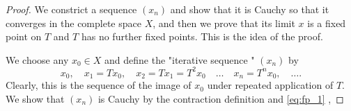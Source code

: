 \documentclass{article}
\theoremstyle{remark}
\begin{document}
\begin{proof}
  We constrict a sequence $\left( x_{n} \right)$ and show that it is Cauchy so that it converges in the complete space $X$, and then we prove that its limit $x$ is a fixed point on $T$ and $T$ has no further fixed points. This is the idea of the proof. 
  \par
  We choose any $x_0 \in X$ and define the "iterative sequence " $\left( x_{n} \right)$ by 
  \begin{equation}
  \label{eq:fp_1}
    x_0, \quad  x_1 = Tx_0, \quad  x_2 =Tx_1 = T^{2}x_0 \quad \ldots \quad x_{n} = T^{n} x_0, \quad   \ldots    
  .\end{equation}
  Clearly, this is the sequence of the image of $x_0$ under repeated application of $T$. We show that $\left( x_{n} \right)$ is Cauchy by the contraction definition and \eqref{eq:fp_1} , 


\end{proof}
\end{document}
